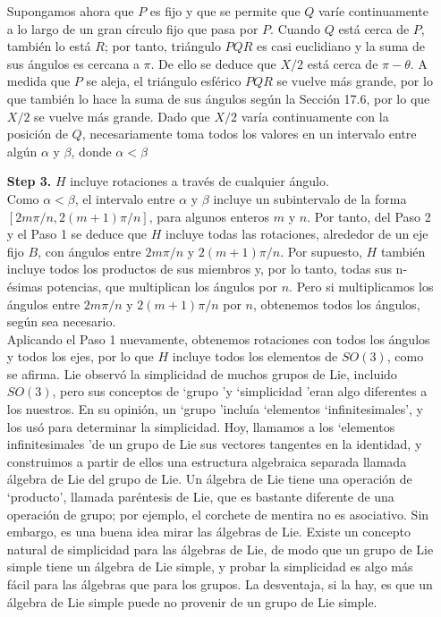 \documentclass[11pt]{book}
\numberwithin{equation}{section}
\theoremstyle{plain}  %
\begin{document}
\begin{itemize}
Supongamos ahora que $P$ es fijo y que se permite que $Q$ varíe
continuamente a lo largo de un gran círculo fijo que pasa por
$P$. Cuando $Q$ está cerca de $P$, también lo está $R$; por tanto, 
triángulo $PQR$ es casi euclidiano y la suma de sus ángulos es
cercana a $\pi$. 
De ello se deduce que $X/2$ está 
cerca de 
$\pi - \theta$.
A medida que $P$ se aleja, el triángulo esférico $PQR$ se vuelve más
grande, por lo que también lo hace la suma de sus ángulos según
la Sección 17.6, por lo que $X/2$ se vuelve más grande. Dado que
$X/2$ varía continuamente con la posición de $Q$, necesariamente
toma todos los valores en un intervalo entre algún $\alpha$ y $\beta$, donde $\alpha < \beta$ 



\item[\textbf{Step 3.}] $H$ incluye rotaciones a través de cualquier ángulo.
\\
Como $\alpha < \beta$, el intervalo entre $\alpha$ y $\beta$ incluye un subintervalo
de la forma $[2m\pi / n, 2(m+1)\pi / n]$, para algunos enteros $m$ y $n$.
Por tanto, del Paso 2 y el Paso 1 se deduce que $H$ incluye
todas las rotaciones, alrededor de un eje fijo $B$, con ángulos
entre $2m\pi / n$ y $2(m+1)\pi /n$. Por supuesto, $H$ también incluye
todos los productos de sus miembros y, por lo tanto, todas
sus n-ésimas potencias, que multiplican los ángulos por $n$.
Pero si multiplicamos los ángulos entre $2m\pi /n$ y $2(m + 1)\pi /n$
por $n$, obtenemos todos los ángulos, según sea necesario.
\\
Aplicando el Paso 1 nuevamente, obtenemos rotaciones con
todos los ángulos y todos los ejes, por lo que $H$ incluye
todos los elementos de $SO(3)$, como se afirma. Lie observó la
simplicidad de muchos grupos de Lie, incluido $SO(3)$, pero sus
conceptos de  \textquoteleft grupo \textquoteright y \textquoteleft simplicidad \textquoteright eran algo diferentes a
los nuestros. En su opinión, un \textquoteleft grupo \textquoteright incluía \textquoteleft elementos
\textquoteleft infinitesimales\textquoteright, y los usó para determinar la simplicidad.
Hoy, llamamos a los \textquoteleft elementos infinitesimales \textquoteright de un grupo
de Lie sus vectores tangentes en la identidad, y construimos
a partir de ellos una estructura algebraica separada llamada
álgebra de Lie del grupo de Lie. Un álgebra de Lie tiene una
operación de \textquoteleft producto\textquoteright , llamada paréntesis de Lie, que es
bastante diferente de una operación de grupo; por ejemplo, el
corchete de mentira no es asociativo. Sin embargo, es una
buena idea mirar las álgebras de Lie. Existe un concepto
natural de simplicidad para las álgebras de Lie, de modo que
un grupo de Lie simple tiene un álgebra de Lie simple, y
probar la simplicidad es algo más fácil para las álgebras que
para los grupos. La desventaja, si la hay, es que un álgebra
de Lie simple puede no provenir de un grupo de Lie simple.
\\



\end{itemize}
\end{document}
